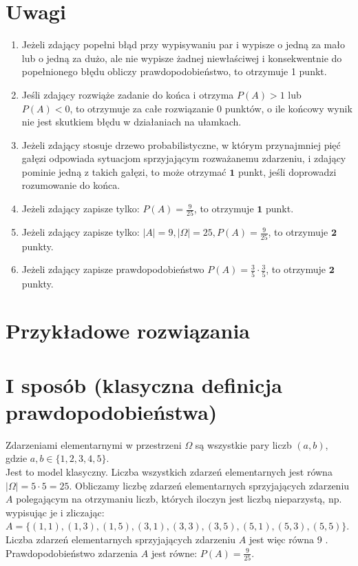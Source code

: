 \documentclass[10pt]{article}
\begin{document}
\section*{Uwagi}
\begin{enumerate}
  \item Jeżeli zdający popełni błąd przy wypisywaniu par i wypisze o jedną za mało lub o jedną za dużo, ale nie wypisze żadnej niewłaściwej i konsekwentnie do popełnionego błędu obliczy prawdopodobieństwo, to otrzymuje 1 punkt.
  \item Jeśli zdający rozwiąże zadanie do końca i otrzyma $P(A)>1$ lub $P(A)<0$, to otrzymuje za całe rozwiązanie 0 punktów, o ile końcowy wynik nie jest skutkiem błędu w działaniach na ułamkach.
  \item Jeżeli zdający stosuje drzewo probabilistyczne, w którym przynajmniej pięć gałęzi odpowiada sytuacjom sprzyjającym rozważanemu zdarzeniu, i zdający pominie jedną z takich gałęzi, to może otrzymać $\mathbf{1}$ punkt, jeśli doprowadzi rozumowanie do końca.
  \item Jeżeli zdający zapisze tylko: $P(A)=\frac{9}{25}$, to otrzymuje $\mathbf{1}$ punkt.
  \item Jeżeli zdający zapisze tylko: $|A|=9,|\Omega|=25, P(A)=\frac{9}{25}$, to otrzymuje $\mathbf{2}$ punkty.
  \item Jeżeli zdający zapisze prawdopodobieństwo $P(A)=\frac{3}{5} \cdot \frac{3}{5}$, to otrzymuje $\mathbf{2}$ punkty.
\end{enumerate}

\section*{Przykładowe rozwiązania}
\section*{I sposób (klasyczna definicja prawdopodobieństwa)}
Zdarzeniami elementarnymi w przestrzeni $\Omega$ są wszystkie pary liczb $(a, b)$, gdzie $a, b \in\{1,2,3,4,5\}$.\\
Jest to model klasyczny. Liczba wszystkich zdarzeń elementarnych jest równa $|\Omega|=5 \cdot 5=25$. Obliczamy liczbę zdarzeń elementarnych sprzyjających zdarzeniu $A$ polegającym na otrzymaniu liczb, których iloczyn jest liczbą nieparzystą, np. wypisując je i zliczając:\\
$A=\{(1,1),(1,3),(1,5),(3,1),(3,3),(3,5),(5,1),(5,3),(5,5)\}$.\\
Liczba zdarzeń elementarnych sprzyjających zdarzeniu $A$ jest więc równa 9 .\\
Prawdopodobieństwo zdarzenia $A$ jest równe: $P(A)=\frac{9}{25}$.
\end{document}
